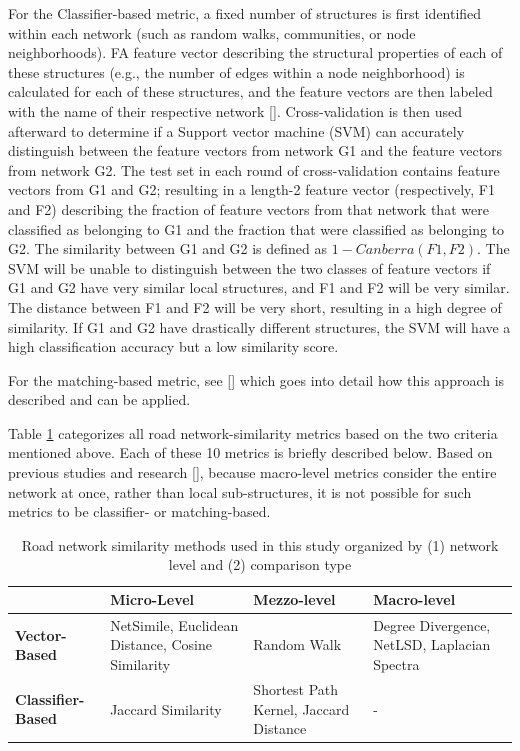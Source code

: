 For the Classifier-based metric, a fixed number of structures is first identified within each network (such as random walks, communities, or node neighborhoods). FA feature vector describing the structural properties of each of these structures (e.g., the number of edges within a node neighborhood) is calculated for each of these structures, and the feature vectors are then labeled with the name of their respective network [\cite{Soundarajan:2014}]. Cross-validation is then used afterward to determine if a Support vector machine (SVM) can accurately distinguish between the feature vectors from network G1 and the feature vectors from network G2. The test set in each round of cross-validation contains feature vectors from G1 and G2; resulting in a length-2 feature vector (respectively, F1 and F2) describing the fraction of feature vectors from that network that were classified as belonging to G1 and the fraction that were classified as belonging to G2. The similarity between G1 and G2 is defined as $1-Canberra(F1, F2)$. The SVM will be unable to distinguish between the two classes of feature vectors if G1 and G2 have very similar local structures, and F1 and F2 will be very similar. The distance between F1 and F2 will be very short, resulting in a high degree of similarity. If G1 and G2 have drastically different structures, the SVM will have a high classification accuracy but a low similarity score.

For the matching-based metric, see [\cite{Soundarajan:2014}] which goes into detail how this approach is described and can be applied. 

Table \ref{tab:Road Network Similarity Methods} categorizes all road network-similarity metrics based on the two criteria mentioned above. Each of these 10 metrics is briefly described below. Based on previous studies and research [\cite{Soundarajan:2014}], because macro-level metrics consider the entire network at once, rather than local sub-structures, it is not possible for such metrics to be classifier- or matching-based.

\begin{table}[!h]
\centering
\begin{tabular}{|p{3cm}|p{3cm}|p{3cm}|p{3cm}|}
\hline
& \textbf{Micro-Level} & \textbf{Mezzo-level} & \textbf{Macro-level} \\ \hline
\textbf{Vector-Based} & NetSimile, Euclidean Distance, Cosine Similarity  & Random Walk & Degree Divergence, NetLSD, Laplacian Spectra \\ \hline
\textbf{Classifier-Based} & Jaccard Similarity & Shortest Path Kernel, Jaccard Distance  & - \\ \hline
\end{tabular}
\caption{Road network similarity methods used in this study organized by (1) network level and (2) comparison type}
\label{tab:Road Network Similarity Methods}
\end{table}

